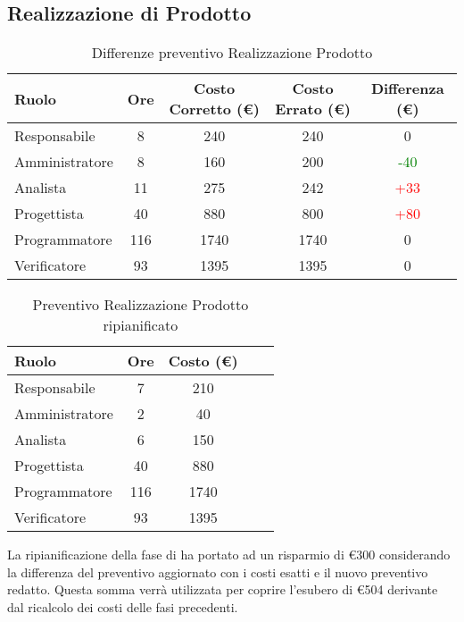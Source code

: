 \subsection{Realizzazione di Prodotto}
\begin{table}[h]
\begin{center}
\begin{tabular}{|l|c|c|c|c|}
\hline Ruolo & Ore & Costo Corretto (\euro) & Costo Errato (\euro) & Differenza (\euro) \\
\hline
Responsabile & 8 & 240  & 240 & 0\\
Amministratore & 8 & 160 & 200 & \textcolor{Green}{-40}\\
Analista & 11 & 275 & 242 & \textcolor{red}{+33}\\
Progettista & 40 & 880 & 800 & \textcolor{red}{+80}\\
Programmatore & 116 & 1740 & 1740 & 0\\
Verificatore & 93 & 1395 & 1395 & 0\\
\hline
\end{tabular}
\caption{Differenze preventivo Realizzazione Prodotto}
\end{center}
\end{table}
\FloatBarrier
\begin{table}[h]
\begin{center}
\begin{tabular}{|l|c|c|c|c|}
\hline Ruolo & Ore & Costo (\euro) \\
\hline
Responsabile & 7 & 210 \\
Amministratore & 2 & 40 \\
Analista & 6 & 150 \\
Progettista & 40 & 880\\
Programmatore & 116 & 1740\\
Verificatore & 93 & 1395\\
\hline
\end{tabular}
\caption{Preventivo Realizzazione Prodotto ripianificato}
\end{center}
\end{table}
\FloatBarrier
La ripianificazione della fase di \fC ha portato ad un risparmio di \euro300 considerando la differenza del preventivo aggiornato con i costi esatti e il nuovo preventivo redatto.
Questa somma verrà utilizzata per coprire l'esubero di \euro504 derivante dal ricalcolo dei costi delle fasi precedenti.
\newpage
